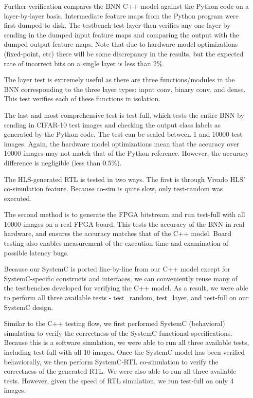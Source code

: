 
Further verification compares the BNN C++ model against the Python code
on a layer-by-layer basis. Intermediate feature maps from the Python
program were first dumped to disk. The testbench test-layer then verifies
any one layer by sending in the dumped input feature maps and comparing
the output with the dumped output feature maps. Note that due to hardware
model optimizations (fixed-point, etc) there will be some discrepancy in
the results, but the expected rate of incorrect bits on a single layer is
less than 2\%.

The layer test is extremely useful as there are three functions/modules
in the BNN corresponding to the three layer types: input conv, binary
conv, and dense. This test verifies each of these functions in isolation.

The last and most comprehensive test is test-full, which tests the entire
BNN by sending in CIFAR-10 test images and checking the output class
labels as generated by the Python code. The test can be scaled between 1
and 10000 test images. Again, the hardware model optimizations mean that
the accuracy over 10000 images may not match that of the Python
reference. However, the accuracy difference is negligible (less than
0.5\%).


The HLS-generated RTL is tested in two ways. The first is through Vivado
HLS' co-simulation feature. Because co-sim is quite slow, only
test-random was executed.

The second method is to generate the FPGA bitstream and run test-full
with all 10000 images on a real FPGA board. This tests the accuracy of
the BNN in real hardware, and ensures the accuracy matches that of the
C++ model. Board testing also enables measurement of the execution time
and examination of possible latency bugs.


Because our SystemC is ported line-by-line from our C++ model except for
SystemC-specific constructs and interfaces, we can conveniently reuse
many of the testbenches developed for verifying the C++ model. As a
result, we were able to perform all three available tests - test\_random,
test\_layer, and test-full on our SystemC design.

Similar to the C++ testing flow, we first performed SystemC (behavioral)
simulation to verify the correctness of the SystemC functional
specifications. Because this is a software simulation, we were able to
run all three available tests, including test-full with all 10 images.
Once the SystemC model has been verified behaviorally, we then perform
SystemC-RTL co-simulation to verify the correctness of the generated RTL.
We were also able to run all three available tests. However, given the
speed of RTL simulation, we run test-full on only 4 images.

